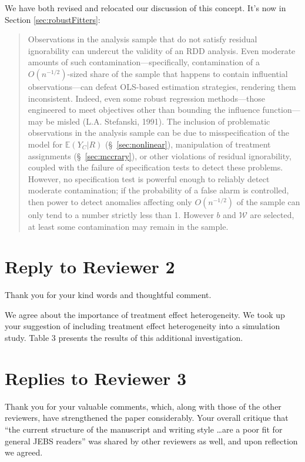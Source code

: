 \documentclass[12pt]{article}
\newcommand{\EE}{\mathbb{E}}
\begin{document}
\begin{itemize}
\begin{itemize}
   We have both revised and relocated our discussion of this
   concept.  It's now in Section \ref{sec:robustFitters}:
   \begin{quote}
Observations in the analysis sample that do not satisfy residual
ignorability %
 can undercut the validity of an RDD analysis.
Even moderate amounts of such contamination---specifically, contamination of
a $O(n^{-1/2})$-sized
share of the sample that happens to contain influential
observations---can defeat OLS-based estimation strategies, rendering
them inconsistent.
Indeed, even some robust regression methods---those engineered to meet
objectives other than bounding the influence function---may be misled
(L.A. Stefanski, 1991).
The inclusion of problematic observations in the analysis sample can
be due to misspecification of the model for $\EE (Y_{C}|R)$
(\S~\ref{sec:nonlinear}), manipulation of treatment assignments
(\S~\ref{sec:mccrary}), or other violations of residual ignorability,
coupled with the failure of specification tests to detect these problems.
However, no specification test is powerful enough
to reliably detect moderate contamination; if the probability of a 
false alarm is controlled, then power to detect anomalies
affecting only $O(n^{-1/2})$ of the sample can only tend to a number
strictly less than 1.
However $b$ and $\mathcal{W}$ are selected, at least some
contamination may remain in the sample.
   \end{quote}
   
\end{itemize}
\end{itemize}

\section{Reply to Reviewer 2}

Thank you for your kind words and thoughtful comment. 

We agree about the importance of treatment effect heterogeneity.
We took up your suggestion of
including treatment effect heterogeneity into a simulation study. 
 Table 3 presents the results of this additional investigation. 




\section{Replies to Reviewer 3}
Thank you for your valuable comments, which, along with those of the
other reviewers, have strengthened the paper considerably. Your
overall critique that ``the current structure of the manuscript
and writing style \dots are a poor fit for general JEBS readers'' was
shared by other reviewers as well, and upon reflection we agreed.
\end{document}
